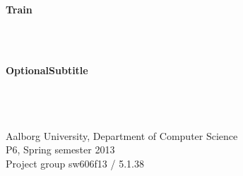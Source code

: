 \thispagestyle{empty}

\begin{center}
\vspace*{\fill}
	\hrulefill\newline
	\\
	\begin{LARGE}	
	\textbf{Train}
	\end{LARGE}
	\\
	\begin{large} 
	\textbf{\\OptionalSubtitle}%
	\end{large}\\
	\hrulefill\newline
	\\~\\
	Aalborg University, Department of Computer Science\\
	P6, Spring semester 2013\\
	Project group sw606f13 / 5.1.38\\

\vspace*{1.5cm}
\begin{figure}[H]
\end{figure}
\vspace*{\fill}
\end{center}

\pagebreak